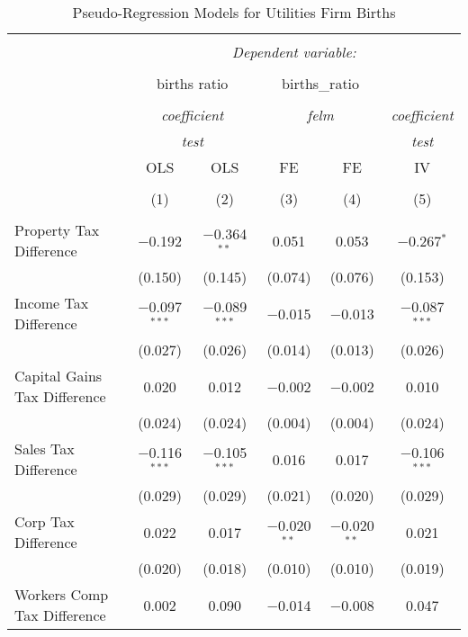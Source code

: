 
\begin{table}[!htbp] \centering 
  \caption{Pseudo-Regression Models for  Utilities Firm Births} 
  \label{} 
\begin{tabular}{@{\extracolsep{5pt}}lccccc} 
\\[-1.8ex]\hline 
\hline \\[-1.8ex] 
 & \multicolumn{5}{c}{\textit{Dependent variable:}} \\ 
\cline{2-6} 
\\[-1.8ex] & \multicolumn{2}{c}{births ratio} & \multicolumn{2}{c}{births\_ratio} &   \\ 
\\[-1.8ex] & \multicolumn{2}{c}{\textit{coefficient}} & \multicolumn{2}{c}{\textit{felm}} & \textit{coefficient} \\ 
 & \multicolumn{2}{c}{\textit{test}} & \multicolumn{2}{c}{\textit{}} & \textit{test} \\ 
 & OLS & OLS & FE & FE & IV \\ 
\\[-1.8ex] & (1) & (2) & (3) & (4) & (5)\\ 
\hline \\[-1.8ex] 
 Property Tax Difference & $-$0.192 & $-$0.364$^{**}$ & 0.051 & 0.053 & $-$0.267$^{*}$ \\ 
  & (0.150) & (0.145) & (0.074) & (0.076) & (0.153) \\ 
  Income Tax Difference & $-$0.097$^{***}$ & $-$0.089$^{***}$ & $-$0.015 & $-$0.013 & $-$0.087$^{***}$ \\ 
  & (0.027) & (0.026) & (0.014) & (0.013) & (0.026) \\ 
  Capital Gains Tax Difference & 0.020 & 0.012 & $-$0.002 & $-$0.002 & 0.010 \\ 
  & (0.024) & (0.024) & (0.004) & (0.004) & (0.024) \\ 
  Sales Tax Difference & $-$0.116$^{***}$ & $-$0.105$^{***}$ & 0.016 & 0.017 & $-$0.106$^{***}$ \\ 
  & (0.029) & (0.029) & (0.021) & (0.020) & (0.029) \\ 
  Corp Tax Difference & 0.022 & 0.017 & $-$0.020$^{**}$ & $-$0.020$^{**}$ & 0.021 \\ 
  & (0.020) & (0.018) & (0.010) & (0.010) & (0.019) \\ 
  Workers Comp Tax Difference & 0.002 & 0.090 & $-$0.014 & $-$0.008 & 0.047 \\ 

\end{tabular}
\end{table}
